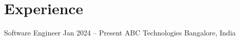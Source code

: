 
%
%
%
%
%
%
%
%
%
%
%
%
%

\section{Experience}

\resumeSubHeadingListStart


\resumeSubheading
    {Software Engineer}
    {Jan 2024 -- Present}
    {ABC Technologies}
    {Bangalore, India}

